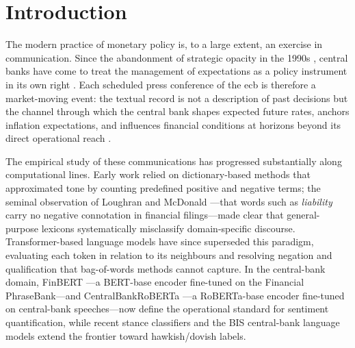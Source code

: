 \chapter*{Introduction} %

The modern practice of monetary policy is, to a large extent, an exercise in communication. Since the abandonment of strategic opacity in the 1990s \cite{NBERw11898}, central banks have come to treat the management of expectations as a policy instrument in its own right \cite{blinder2008central, daly2025dynamic}. Each scheduled press conference of the \gls{ecb} is therefore a market-moving event: the textual record is not a description of past decisions but the channel through which the central bank shapes expected future rates, anchors inflation expectations, and influences financial conditions at horizons beyond its direct operational reach \cite{Istrefi2021ECB}.

The empirical study of these communications has progressed substantially along computational lines. Early work relied on dictionary-based methods that approximated tone by counting predefined positive and negative terms; the seminal observation of Loughran and McDonald \cite{LoughranMcDonald2011}---that words such as \textit{liability} carry no negative connotation in financial filings---made clear that general-purpose lexicons systematically misclassify domain-specific discourse. Transformer-based language models have since superseded this paradigm, evaluating each token in relation to its neighbours and resolving negation and qualification that bag-of-words methods cannot capture. In the central-bank domain, FinBERT \cite{araci2019finbert}---a BERT-base encoder fine-tuned on the Financial PhraseBank---and CentralBankRoBERTa \cite{Pfeifer2023}---a RoBERTa-base encoder fine-tuned on central-bank speeches---now define the operational standard for sentiment quantification, while recent stance classifiers \cite{shah2023trillion, shah2025wcb} and the BIS central-bank language models \cite{BIS_WP1215_2024} extend the frontier toward hawkish/dovish labels.

